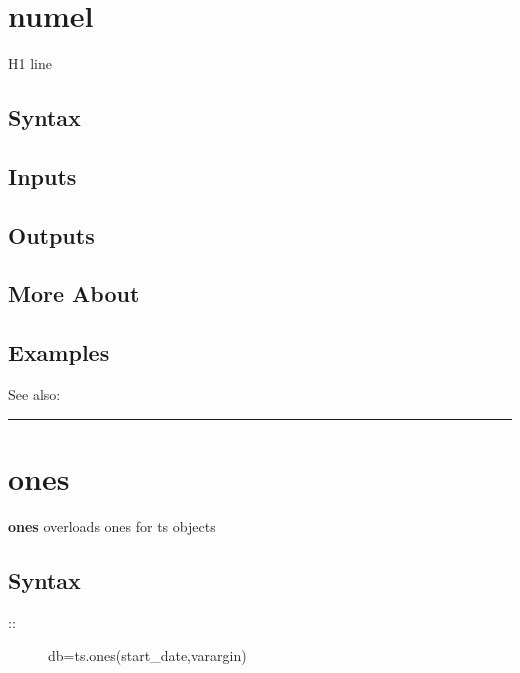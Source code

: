 \documentclass[letterpaper,10pt,english]{sphinxmanual}
\begin{document}
\section{numel}
\label{classes/time_series/@ts/ts:id409}\label{classes/time_series/@ts/ts:numel}
H1 line


\subsection{Syntax}
\label{classes/time_series/@ts/ts:id410}

\subsection{Inputs}
\label{classes/time_series/@ts/ts:id411}

\subsection{Outputs}
\label{classes/time_series/@ts/ts:id412}

\subsection{More About}
\label{classes/time_series/@ts/ts:id413}

\subsection{Examples}
\label{classes/time_series/@ts/ts:id414}
See also:


\bigskip\hrule{}\bigskip



\section{ones}
\label{classes/time_series/@ts/ts:ones}\label{classes/time_series/@ts/ts:id415}
\textbf{ones} overloads ones for ts objects


\subsection{Syntax}
\label{classes/time_series/@ts/ts:id416}\begin{description}
\item[{::}] \leavevmode
db=ts.ones(start\_date,varargin)

\end{description}
\end{document}
